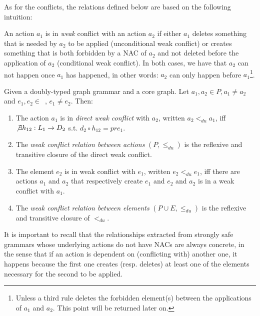 As for the conflicts, the relations defined below are based on the following intuition: 

\begin{intuition} An action $a_1$ is in \emph{weak} conflict with an action $a_2$ if either $a_1$ deletes something that is needed by $a_2$ to be applied (unconditional weak conflict) or creates something that is both forbidden by a NAC of $a_2$ and not deleted before the application of $a_2$ (conditional weak conflict). In both cases, we have that $a_2$ can not happen once $a_1$ has happened, in other words: $a_2$ can only happen before $a_1$\footnote{Unless a third rule deletes the forbidden
  element(s) between the applications of $a_1$ and $a_2$. This point will be returned later on.}.
\end{intuition}


\begin{definition} Given \doublyTypedGraphGrammarCore{} a doubly-typed graph grammar and \coreGraph{} a core graph. Let $a_1, a_2 \in P, a_1 \ne a_2$ and \mbox{$e_1, e_2 \in $ \coreGraph{},} $e_1 \ne e_2$. Then: 

  \begin{enumerate}
    \item The action $a_1$ is in \emph{direct weak conflict} with $a_2$, written $a_2 <_{du} a_1$, iff \mbox{$\not\exists h_{12} : L_1 \rightarrow D_2$} s.t. \mbox{$d_2 \circ h_{12} = pre_1$}.

   \item The \emph{weak conflict relation between actions} $(P,\leq_{du})$ is the reflexive and transitive closure of the direct weak conflict.
   \item The element $e_2$ is in weak conflict with $e_1$, written $e_2 <_{du} e_1$, iff there are actions $a_1$ and $a_2$ that respectively create $e_1$ and $e_2$ and $a_2$ is in a weak conflict with $a_1$.
   \item The \emph{weak conflict relation between elements} $(P \cup E, \leq_{du})$ is the reflexive and transitive closure of $<_{du}$.
  \end{enumerate}
\end{definition}

It is important to recall that the relationships extracted from strongly safe grammars whose underlying actions do not have NACs are always concrete, in the sense that if an action is dependent on (conflicting with) another one, it happens because the first one creates (resp. deletes) at least one of the elements necessary for the second to be applied.

